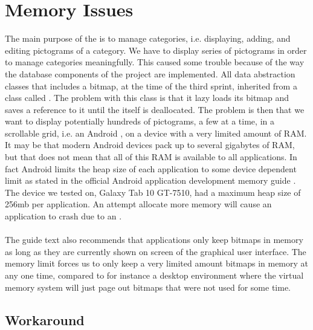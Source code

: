 
\section{Memory Issues}
\label{sec:memory_issues}

The main purpose of the \ct is to manage categories, i.e. displaying, adding, and editing pictograms of a category. We have to display series of pictograms in order to manage categories meaningfully. This caused some trouble because of the way the database components of the project are implemented. All data abstraction classes that includes a bitmap, at the time of the third sprint, inherited from a class called . The problem with this class is that it lazy loads its bitmap and saves a reference to it until the  itself is deallocated. The problem is then that we want to display potentially hundreds of pictograms, a few at a time, in a scrollable grid, i.e. an Android , on a device with a very limited amount of RAM. It may be that modern Android devices pack up to several gigabytes of RAM, but that does not mean that all of this RAM is available to all applications. In fact Android limits the heap size of each application to some device dependent limit as stated in the official Android application development memory guide \parencite{android_memory}. The device we tested on, Galaxy Tab 10 GT-7510, had a maximum heap size of 256mb per application. An attempt allocate more memory will cause an application to crash due to an .
\\\\
The guide text also recommends that applications only keep bitmaps in memory as long as they are currently shown on screen of the graphical user interface. The memory limit forces us to only keep a very limited amount bitmaps in memory at any one time, compared to for instance a desktop environment where the virtual memory system will just page out bitmaps that were not used for some time.

\subsection{Workaround}
\label{subsec:pictogram_workaround}

